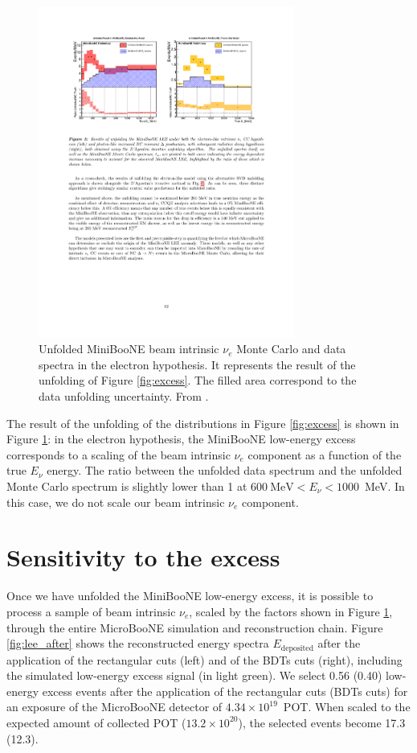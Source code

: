 \begin{figure}[htbp]
\centering
\includegraphics[width=0.75\textwidth]{figures/lee_result.pdf} 
\caption{Unfolded MiniBooNE beam intrinsic $\nu_e$ Monte Carlo and data spectra in the electron hypothesis. It represents the result of the unfolding of Figure \ref{fig:excess}. The filled area correspond to the data unfolding uncertainty. From \cite{lee_unfolding}.} 
\label{fig:lee_scaling}
\end{figure}

The result of the unfolding of the distributions in Figure \ref{fig:excess} is shown in Figure \ref{fig:lee_scaling}: in the electron hypothesis, the MiniBooNE low-energy excess corresponds to a scaling of the beam intrinsic $\nu_e$ component as a function of the true $E_{\nu}$ energy. The ratio between the unfolded data spectrum and the unfolded Monte Carlo spectrum is slightly lower than 1 at $600~\mathrm{MeV} < E_{\nu} < 1000$~MeV. In this case, we do not scale our beam intrinsic $\nu_e$ component.

\section{Sensitivity to the excess}
Once we have unfolded the MiniBooNE low-energy excess, it is possible to process a sample of beam intrinsic $\nu_e$, scaled by the factors shown in Figure \ref{fig:lee_scaling}, through the entire MicroBooNE simulation and reconstruction chain. Figure \ref{fig:lee_after} shows the reconstructed energy spectra $E_{\mathrm{deposited}}$ after the application of the rectangular cuts (left) and of the BDTs cuts (right), including the simulated low-energy excess signal (in light green). We select 0.56 (0.40) low-energy excess events after the application of the rectangular cuts (BDTs cuts) for an exposure of the MicroBooNE detector of $4.34\times10^{19}$~POT. When scaled to the expected amount of collected POT ($13.2\times10^{20}$), the selected events become 17.3 (12.3).


